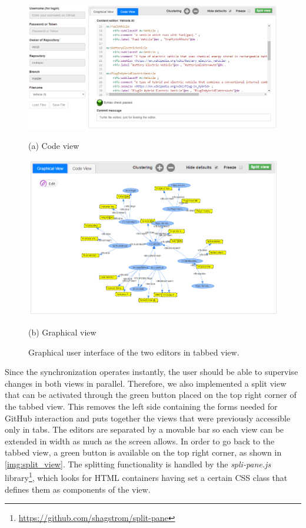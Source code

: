 \begin{figure}[!htbp]
	\begin{minipage}[b]{\linewidth}
 	 	\centering
  		\centerline{\includegraphics[width=\linewidth]{img/code_view.png}}
  		\centerline{(a) Code view}\medskip
	\end{minipage}
	\hfill
	\begin{minipage}[b]{\linewidth}
 		 \centering
  		\centerline{\includegraphics[width=\linewidth]{img/graphical_view.png}}
  		\centerline{(b) Graphical view}\medskip
	\end{minipage}
\caption{Graphical user interface of the two editors in tabbed view.}
\label{img:tabbed_view}
\end{figure}

Since the synchronization operates instantly, the user should be able to supervise changes in both views in parallel. Therefore, we also implemented a split view that can be activated through the green button placed on the top right corner of the tabbed view. This removes the left side containing the forms needed for GitHub interaction and puts together the views that were previously accessible only in tabs. The editors are separated by a movable bar so each view can be extended in width as much as the screen allows. In order to go back to the tabbed view, a green button is available on the top right corner, as shown in \autoref{img:split_view}. The splitting functionality is handled by the \textit{spli-pane.js} library\footnote{\url{https://github.com/shagstrom/split-pane}}, which looks for HTML containers having set a certain CSS class that defines them as components of the view.

